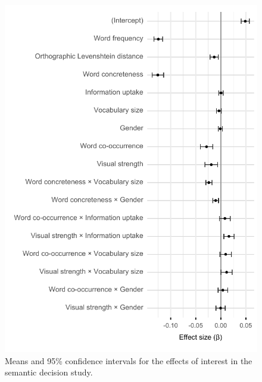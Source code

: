 \documentclass[
  12pt,
  man,floatsintext]{apa7}
\begin{document}
\FloatBarrier

\begin{figure}

{\centering \includegraphics[width=1\linewidth]{../semanticdecision/frequentist_analysis/plots/semanticdecision_confidence_intervals_plot} 

}

\caption{Means and 95\% confidence intervals for the effects of interest in the semantic decision study.}\label{fig:semanticdecision-confidence-intervals-plot}
\end{figure}
\end{document}
